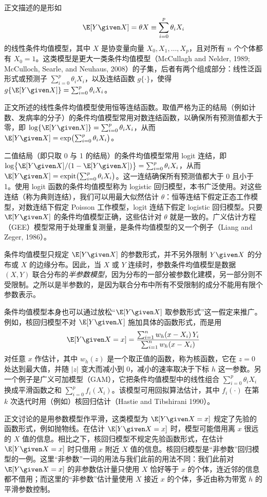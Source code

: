 \begin{techpoint}[常用模型的分类]
正文描述的是形如
\[
\E[Y\given X]=\theta X\equiv\sum_{i=0}^{p}\theta_i X_i
\]
的线性条件均值模型，其中 $X$ 是协变量向量 $X_0,X_1,\dots,X_p$，且对所有 $n$ 个个体都有 $X_0=1$。这类模型是更大一类条件均值模型（McCullagh and Nelder, 1989; McCulloch, Searle, and Neuhaus, 2008）的子集，后者有两个组成部分：线性泛函形式或预测子 $\sum_{i=0}^{p}\theta_iX_i$，以及连结函数 $g\{\cdot\}$，使得 $g\{\E[Y\given X]\}=\sum_{i=0}^{p}\theta_iX_i$。

正文所述的线性条件均值模型使用恒等连结函数。取值严格为正的结局（例如计数、发病率的分子）的条件均值模型常用对数连结函数，以确保所有预测值都大于零，即 $\log\{\E[Y\given X]\}=\sum_{i=0}^{p}\theta_iX_i$，从而 $\E[Y\given X]=\exp\bigl(\sum_{i=0}^{p}\theta_iX_i\bigr)$。

二值结局（即只取 0 与 1 的结局）的条件均值模型常用 logit 连结，即 $\log\bigl\{\E[Y\given X]/(1-\E[Y\given X])\bigr\}=\sum_{i=0}^{p}\theta_iX_i$，从而 $\E[Y\given X]=\mathrm{expit}\bigl(\sum_{i=0}^{p}\theta_iX_i\bigr)$。这一连结确保所有预测值都大于 0 且小于 1。使用 logit 函数的条件均值模型称为 logistic 回归模型，本书广泛使用。对这些连结（称为典则连结），我们可以用最大似然估计 $\theta$：恒等连结下假定正态工作模型，对数连结下假定 Poisson 工作模型，logit 连结下假定 logistic 回归模型。只要 $\E[Y\given X]$ 的条件均值模型正确，这些估计对 $\theta$ 就是一致的。广义估计方程（GEE）模型常用于处理重复测量，是条件均值模型的又一个例子（Liang and Zeger, 1986）。

条件均值模型只规定 $\E[Y\given X]$ 的参数形式，并不另外限制 $Y\given X$ 的分布或 $X$ 的边缘分布。因此，当 $X$ 或 $Y$ 连续时，参数条件均值模型是数据 $(X,Y)$ 联合分布的\emph{半参数模型}，因为分布的一部分被参数化建模，另一部分则不受限制。之所以是半参数的，是因为联合分布中所有不受限制的成分不能用有限个参数表示。

条件均值模型本身也可以通过放松“$\E[Y\given X]$ 取参数形式”这一假定来推广。例如，核回归模型不对 $\E[Y\given X]$ 施加具体的函数形式，而是用
\[
\E[Y\given X=x]=\frac{\sum_{i=1}^{n}w_h(x-X_i)\,Y_i}{\sum_{i=1}^{n}w_h(x-X_i)}
\]
对任意 $x$ 作估计，其中 $w_h(z)$ 是一个取正值的函数，称为核函数，它在 $z=0$ 处达到最大值，并随 $|z|$ 变大而减小到 0，减小的速率取决于下标 $h$ 这一参数。另一个例子是广义可加模型（GAM），它把条件均值模型中的线性组合 $\sum_{i=0}^{p}\theta_iX_i$ 换成平滑函数之和 $\sum_{i=0}^{p}f_i(X_i)$。该模型可用回拟算法估计，其中 $f_i(\cdot)$ 在第 $k$ 次迭代时用（例如）核回归估计（Hastie and Tibshirani 1990）。

正文讨论的是用参数模型作平滑，这类模型为 $\E[Y\given X=x]$ 规定了先验的函数形式，例如抛物线。在估计 $\E[Y\given X=x]$ 时，模型可能借用离 $x$ 很远的 $X$ 值的信息。相比之下，核回归模型不规定先验函数形式，在估计 $\E[Y\given X=x]$ 时只借用 $x$ 附近 $X$ 值的信息。核回归模型是“非参数”回归模型的一例。这里“非参数”一词的用法与我们此前的用法不同：我们此前对 $\E[Y\given X=x]$ 的非参数估计量只使用 $X$ 恰好等于 $x$ 的个体，连近邻的信息都不借用；而这里的“非参数”估计量使用 $X$ 接近 $x$ 的个体，多近由称为带宽 $h$ 的平滑参数控制。
\end{techpoint}
